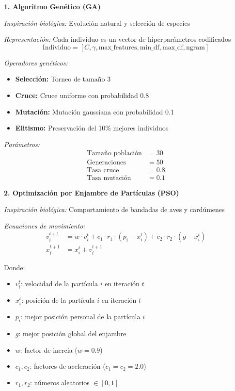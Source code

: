\textbf{1. Algoritmo Genético (GA)}

\textit{Inspiración biológica:} Evolución natural y selección de especies

\textit{Representación:} Cada individuo es un vector de hiperparámetros codificados
\begin{equation}
\text{Individuo} = [C, \gamma, \text{max\_features}, \text{min\_df}, \text{max\_df}, \text{ngram}]
\end{equation}

\textit{Operadores genéticos:}
\begin{itemize}
    \item \textbf{Selección:} Torneo de tamaño 3
    \item \textbf{Cruce:} Cruce uniforme con probabilidad 0.8
    \item \textbf{Mutación:} Mutación gaussiana con probabilidad 0.1
    \item \textbf{Elitismo:} Preservación del 10\% mejores individuos
\end{itemize}

\textit{Parámetros:}
\begin{align}
\text{Tamaño población} &= 30 \\
\text{Generaciones} &= 50 \\
\text{Tasa cruce} &= 0.8 \\
\text{Tasa mutación} &= 0.1
\end{align}

\textbf{2. Optimización por Enjambre de Partículas (PSO)}

\textit{Inspiración biológica:} Comportamiento de bandadas de aves y cardúmenes

\textit{Ecuaciones de movimiento:}
\begin{align}
v_{i}^{t+1} &= w \cdot v_{i}^{t} + c_1 \cdot r_1 \cdot (p_{i} - x_{i}^{t}) + c_2 \cdot r_2 \cdot (g - x_{i}^{t}) \\
x_{i}^{t+1} &= x_{i}^{t} + v_{i}^{t+1}
\end{align}

Donde:
\begin{itemize}
    \item $v_i^t$: velocidad de la partícula $i$ en iteración $t$
    \item $x_i^t$: posición de la partícula $i$ en iteración $t$
    \item $p_i$: mejor posición personal de la partícula $i$
    \item $g$: mejor posición global del enjambre
    \item $w$: factor de inercia ($w = 0.9$)
    \item $c_1, c_2$: factores de aceleración ($c_1 = c_2 = 2.0$)
    \item $r_1, r_2$: números aleatorios $\in [0,1]$
\end{itemize}

